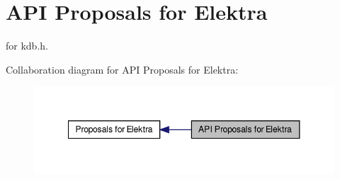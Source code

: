 \hypertarget{group__api}{\section{A\-P\-I Proposals for Elektra}
\label{group__api}
}


for kdb.\-h.  


Collaboration diagram for A\-P\-I Proposals for Elektra\-:
\nopagebreak
\begin{figure}[H]
\begin{center}
\leavevmode
\includegraphics[width=348pt]{group__api}
\end{center}
\end{figure}
